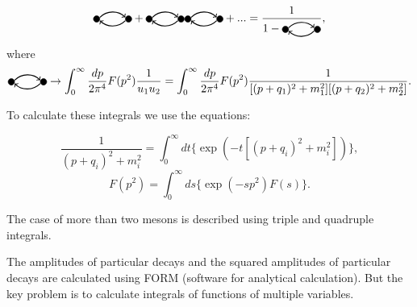 \documentclass[%
]{ittmm}
\begin{document}
\begin{equation}
        \tikz[baseline=-0.5ex]{
        \filldraw (0, 0) circle (0.1cm);
        \filldraw (1, 0) circle (0.1cm);
        \draw[->, thick] (0.1, 0.05) to[out=45, in=135] (0.9, 0.05);
        \draw[<-, thick] (0.1, -0.05) to[out=-45, in=-135] (0.9, -0.05);
    } + \tikz[baseline=-0.5ex]{
        \filldraw (0, 0) circle (0.1cm);
        \filldraw (1, 0) circle (0.1cm);
        \draw[->, thick] (0.1, 0.05) to[out=45, in=135] (0.9, 0.05);
        \draw[<-, thick] (0.1, -0.05) to[out=-45, in=-135] (0.9, -0.05);
    }\tikz[baseline=-0.5ex]{
        \filldraw (0, 0) circle (0.1cm);
        \filldraw (1, 0) circle (0.1cm);
        \draw[->, thick] (0.1, 0.05) to[out=45, in=135] (0.9, 0.05);
        \draw[<-, thick] (0.1, -0.05) to[out=-45, in=-135] (0.9, -0.05);
    } + ... = \frac{1}{1 - \tikz[baseline=-0.5ex]{
        \filldraw (0, 0) circle (0.1cm);
        \filldraw (1, 0) circle (0.1cm);
        \draw[->, thick] (0.1, 0.05) to[out=45, in=135] (0.9, 0.05);
        \draw[<-, thick] (0.1, -0.05) to[out=-45, in=-135] (0.9, -0.05);
    }},
\end{equation}
where 
\begin{equation}
        \tikz[baseline=-0.5ex]{
        \filldraw (0, 0) circle (0.1cm);
        \filldraw (1, 0) circle (0.1cm);
        \draw[->, thick] (0.1, 0.05) to[out=45, in=135] (0.9, 0.05);
        \draw[<-, thick] (0.1, -0.05) to[out=-45, in=-135] (0.9, -0.05);
    } \to \int_{0}^{\infty}\frac{dp}{2\pi^4}F(p^2)\frac{1}{u_1u_2} = \int_{0}^{\infty}\frac{dp}{2\pi^4}F(p^2)\frac{1}{[(p + q_1)^2 + m_1^2][(p + q_2)^2 + m_2^2]}.
\end{equation}

To calculate these integrals we use the equations:

\begin{equation}
    \frac{1}{(p + q_i)^2 + m_i^2} = \int_{0}^{\infty}dt\{\exp(-t[(p + q_i)^2 + m_i^2])\}, 
\end{equation}
\begin{equation}
    F(p^2) = \int_{0}^{\infty}ds\{\exp(-sp^2)F(s)\} .
\end{equation}

The case of more than two mesons is described using triple and quadruple integrals.

The amplitudes of particular decays and the squared amplitudes of particular decays are calculated using FORM 
(software for analytical calculation). But the key problem is to calculate integrals of functions of multiple variables.
\end{document}
